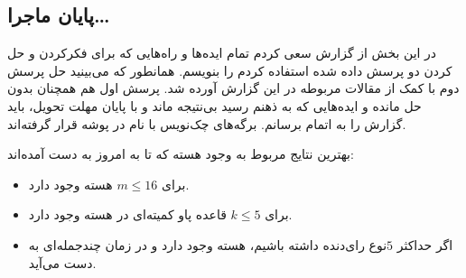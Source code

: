 \documentclass[12pt]{article}
\begin{document}
\subsection{پایان ماجرا\dots}
در این بخش از گزارش سعی کردم تمام ایده‌ها و راه‌هایی که برای فکرکردن و حل کردن
دو پرسش داده شده استفاده کردم را بنویسم. همانطور که می‌بینید حل پرسش دوم با کمک
از مقالات مربوطه در این گزارش آورده شد. پرسش اول هم همچنان بدون حل مانده و ایده‌هایی
که به ذهنم رسید بی‌نتیجه ماند
و با پایان مهلت تحویل، باید گزارش را به اتمام برسانم.
برگه‌های چک‌نویس
با نام 
در پوشه قرار گرفته‌اند.

بهترین نتایج مربوط به وجود هسته که تا به امروز
به دست آمده‌اند:

\begin{itemize}
    \item برای $m \le 16$ هسته وجود دارد.
    \item برای $k \le 5$ قاعده پاو کمیته‌ای در هسته وجود دارد.
    \item اگر حداکثر $5$نوع رای‌دنده داشته باشیم، هسته وجود دارد و در زمان چندجمله‌ای به دست می‌آید.
\end{itemize}
\end{document}
